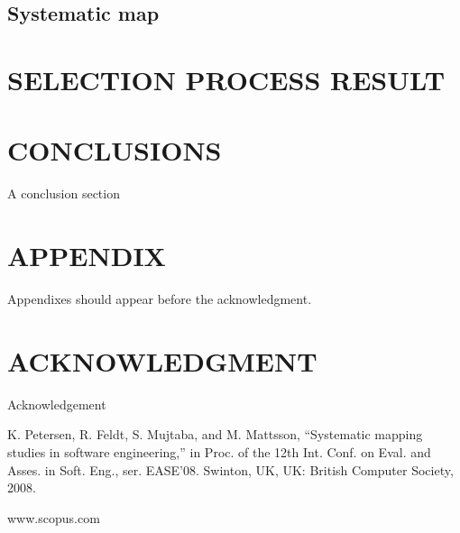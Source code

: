\documentclass[letterpaper, 10 pt, conference]{ieeeconf}  %
\begin{document}
\subsection{Systematic map}


\section{SELECTION PROCESS RESULT}


\section{CONCLUSIONS}

A conclusion section 



\addtolength{\textheight}{-12cm}   








\section*{APPENDIX}

Appendixes should appear before the acknowledgment.

\section*{ACKNOWLEDGMENT}

Acknowledgement


\begin{thebibliography}{99}

 K. Petersen, R. Feldt, S. Mujtaba, and M. Mattsson, “Systematic mapping studies in software engineering,” in Proc. of the 12th Int. Conf. on Eval. and Asses. in Soft. Eng., ser. EASE’08. Swinton, UK, UK: British Computer Society, 2008.

 www.scopus.com









\end{thebibliography}
\end{document}
